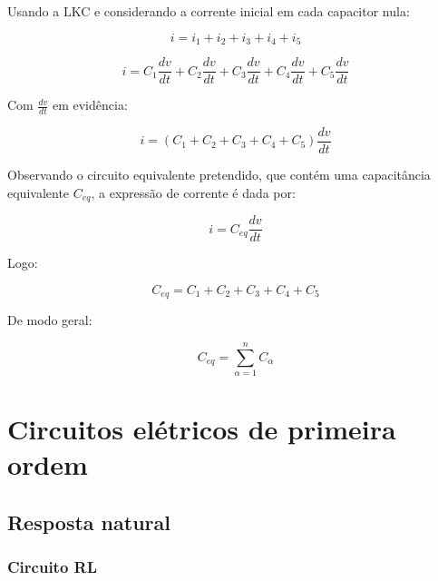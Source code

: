 \documentclass[12pt,fleqn]{book} %
\begin{document}
{Usando a LKC e considerando a corrente inicial em cada capacitor nula:

\begin{equation}
i = i_1+i_2+i_3+i_4+i_5
\end{equation}  

\begin{equation}
i = C_1\frac{dv}{dt} +C_2\frac{dv}{dt} +C_3\frac{dv}{dt} +C_4\frac{dv}{dt} +C_5\frac{dv}{dt}
\end{equation}  

Com $\frac{dv}{dt}$ em evidência:

\begin{equation}
i = (C_1+C_2+C_3+C_4+C_5)\frac{dv}{dt}
\end{equation}

Observando o circuito equivalente pretendido, que contém uma capacitância equivalente $C_{eq}$, a expressão de corrente é dada por:

\begin{equation}
i=C_{eq}\frac{dv}{dt}
\end{equation}

Logo:

\begin{equation}
C_{eq}=C_1+C_2+C_3+C_4+C_5
\end{equation}

De modo geral:

\begin{equation}
C_{eq} = \sum\limits_{\alpha = 1}^{n} C_\alpha
\end{equation}  
    
	
\chapter{Circuitos elétricos de primeira ordem}

    \section{Resposta natural}
    
        \subsection{Circuito RL}
        
}
\end{document}
